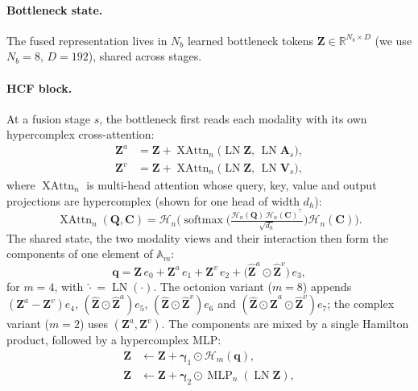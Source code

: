 \paragraph{Bottleneck state.} The fused representation lives in $N_b$ learned bottleneck tokens
$\mathbf{Z}\in\mathbb{R}^{N_b\times D}$ (we use $N_b=8$, $D=192$), shared across stages.

\paragraph{HCF block.} At a fusion stage $s$, the bottleneck first reads each modality with its own
hypercomplex cross-attention:
\begin{equation}
\begin{aligned}
  \mathbf{Z}^{a} &= \mathbf{Z} + \operatorname{XAttn}_{n}\big(\operatorname{LN}\mathbf{Z},\,\operatorname{LN}\mathbf{A}_s\big),\\
  \mathbf{Z}^{v} &= \mathbf{Z} + \operatorname{XAttn}_{n}\big(\operatorname{LN}\mathbf{Z},\,\operatorname{LN}\mathbf{V}_s\big),
\end{aligned}
  \label{eq:xattn}
\end{equation}
where $\operatorname{XAttn}_n$ is multi-head attention whose query, key, value and output projections
are hypercomplex (shown for one head of width $d_h$):
\begin{equation*}
  \operatorname{XAttn}_n(\mathbf{Q},\mathbf{C})=\mathcal{H}_n\Big(\operatorname{softmax}\Big(\tfrac{\mathcal{H}_n(\mathbf{Q})\,\mathcal{H}_n(\mathbf{C})^{\top}}{\sqrt{d_h}}\Big)\mathcal{H}_n(\mathbf{C})\Big).
\end{equation*} The shared
state, the two modality views and their interaction then form the components of one element of
$\mathbb{A}_m$:
\begin{equation}
  \mathbf{q} = \mathbf{Z}\,e_0 + \mathbf{Z}^{a}\,e_1 + \mathbf{Z}^{v}\,e_2 + \big(\hat{\mathbf{Z}}^{a}\odot\hat{\mathbf{Z}}^{v}\big)\,e_3,
  \label{eq:components}
\end{equation}
for $m=4$,
with $\hat{\cdot}=\operatorname{LN}(\cdot)$. The octonion variant ($m=8$) appends
$(\mathbf{Z}^{a}-\mathbf{Z}^{v})e_4$, $(\hat{\mathbf{Z}}\odot\hat{\mathbf{Z}}^{a})e_5$,
$(\hat{\mathbf{Z}}\odot\hat{\mathbf{Z}}^{v})e_6$ and
$(\hat{\mathbf{Z}}\odot\hat{\mathbf{Z}}^{a}\odot\hat{\mathbf{Z}}^{v})e_7$; the complex variant ($m=2$) uses
$(\mathbf{Z}^{a},\mathbf{Z}^{v})$. The components are mixed by a single Hamilton product, followed by a
hypercomplex MLP:
\begin{equation}
\begin{aligned}
  \mathbf{Z} &\leftarrow \mathbf{Z} + \boldsymbol{\gamma}_1\odot \mathcal{H}_m(\mathbf{q}),\\
  \mathbf{Z} &\leftarrow \mathbf{Z} + \boldsymbol{\gamma}_2\odot \operatorname{MLP}_n(\operatorname{LN}\mathbf{Z}),
\end{aligned}
  \label{eq:mix}
\end{equation}
